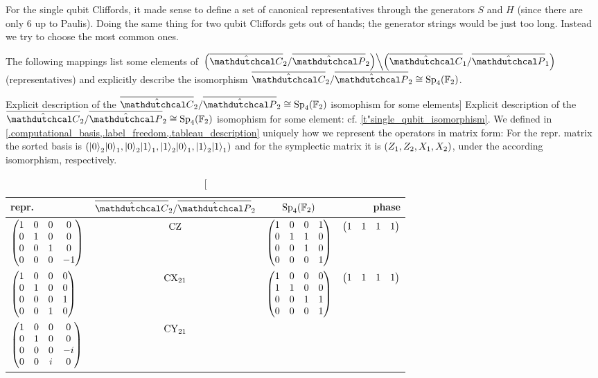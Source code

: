 \documentclass[a4paper,english]{scrartcl}
\begin{document}
\begin{remark}
For the single qubit Cliffords, it made sense to define a set of canonical
representatives through the generators $S$ and $H$ (since there are only $6$ up to
Paulis). Doing the same thing for two qubit Cliffords gets out of hands; the generator
strings would be just too long. Instead we try to choose the most common ones.
\end{remark}
\begin{proposition}
The following mappings list some elements of
$\left.\w(\ouic_2/\ouip_2)\middle\backslash\w(\ouic_1/\ouip_1)\right.$ (representatives)
and explicitly describe the isomorphism $\ouic_2/\ouip_2 \cong \Sp_{4}\w(\F_2)$.
\begin{table}[H]\label{t"two_qubit_isomorphism}
\center
\caption
[Explicit description of the $\ouic_2/\ouip_2 \cong \Sp_{4}\w(\F_2)$ isomophism for some
elements]
{Explicit description of the $\ouic_2/\ouip_2 \cong \Sp_{4}\w(\F_2)$ isomophism for some
element: cf. \cref{t"single_qubit_isomorphism}. We defined in
\cref{.computational_basis,.label_freedom,.tableau_description} uniquely how we
represent the operators in matrix form: For the repr. matrix the sorted basis is
$\w(\er{0}_2\er{0}_1, \er{0}_2\er{1}_1, \er{1}_2\er{0}_1, \er{1}_2\er{1}_1)$ and for the
symplectic matrix it is $\w(Z_1, Z_2, X_1, X_2)$, under the according isomorphism,
respectively.}
\begin{tabular}{lccr}
  \toprule
  repr. & $\ouic_2/\ouip_2$ & $\Sp_{4}\w(\F_2)$ & phase\\
  \midrule
  $\begin{pmatrix}1&0&0&0\\0&1&0&0\\0&0&1&0\\0&0&0&-1\end{pmatrix}$ & $\cz$ &
  $\begin{pmatrix}1&0&0&1\\0&1&1&0\\0&0&1&0\\0&0&0&1\end{pmatrix}$ & $\begin{pmatrix}1&1&1&1\end{pmatrix}$\\
  \midrule
  $\begin{pmatrix}1&0&0&0\\0&1&0&0\\0&0&0&1\\0&0&1&0\end{pmatrix}$ & $\cx_{21}$ &
  $\begin{pmatrix}1&0&0&0\\1&1&0&0\\0&0&1&1\\0&0&0&1\end{pmatrix}$ & $\begin{pmatrix}1&1&1&1\end{pmatrix}$\\
  \midrule
  $\begin{pmatrix}1&0&0&0\\0&1&0&0\\0&0&0&-i\\0&0&i&0\end{pmatrix}$ & $\cy_{21}$ &

\end{tabular}
\end{table}
\end{proposition}
\end{document}
